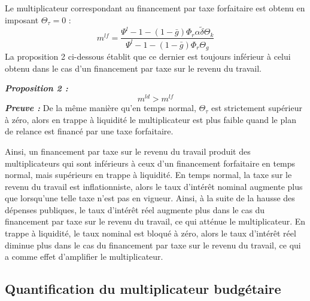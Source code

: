 \documentclass[12pt,letterpaper]{article}
\newcommand{\gbar}{\bar{g}}
\newcommand{\dtilde}{\tilde{\delta}}
\newcommand{\Theg}{\Theta_g}
\newcommand{\Thek}{\Theta_k}
\newcommand{\Thet}{\Theta_\tau}
\newcommand{\Phir}{\Phi_r}
\begin{document}
Le multiplicateur correspondant au financement par taxe forfaitaire est obtenu en imposant $\Thet = 0$ :
\begin{equation}
m^{lf} = \frac{\Psi^l - 1 - (1-\gbar)\Phir\alpha\dtilde\Thek}{\Psi^l - 1 - (1-\gbar)\Phir\Theg} \tag{53}
\end{equation}
La proposition 2 ci-dessous établit que ce dernier est toujours inférieur à celui obtenu dans le cas d’un financement par taxe sur le revenu du travail.

\medskip
\noindent\textbf{\emph{Proposition 2 :}}
\begin{equation}
m^{ld} > m^{lf} \tag{54}
\end{equation}
\noindent\textbf{\emph{Preuve :}} De la même manière qu’en temps normal, $\Thet$ est strictement supérieur à zéro, alors en trappe à liquidité le multiplicateur est plus faible quand le plan de relance est financé par une taxe forfaitaire.

\medskip
Ainsi, un financement par taxe sur le revenu du travail produit des multiplicateurs qui sont inférieurs à ceux d’un financement forfaitaire en temps normal, mais supérieurs en trappe à liquidité. En temps normal, la taxe sur le revenu du travail est inflationniste, alors le taux d’intérêt nominal augmente plus que lorsqu’une telle taxe n’est pas en vigueur. Ainsi, à la suite de la hausse des dépenses publiques, le taux d’intérêt réel augmente plus dans le cas du financement par taxe sur le revenu du travail, ce qui atténue le multiplicateur. En trappe à liquidité, le taux nominal est bloqué à zéro, alors le taux d’intérêt réel diminue plus dans le cas du financement par taxe sur le revenu du travail, ce qui a comme effet d’amplifier le multiplicateur.

\subsection{Quantification du multiplicateur budgétaire}
\end{document}
